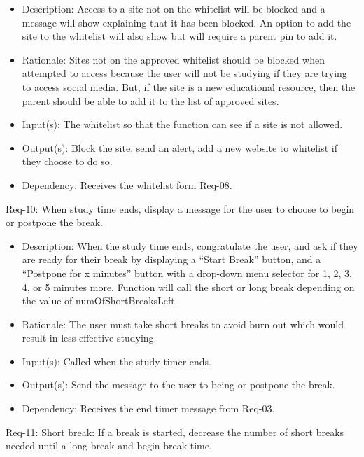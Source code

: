 \documentclass[12pt]{article}
\begin{document}
\begin{itemize}
    \item Description: Access to a site not on the whitelist will be blocked and a message will show explaining that it has been blocked. An option to add the site to the whitelist will also show but will require a parent pin to add it.
    \item Rationale: Sites not on the approved whitelist should be blocked when attempted to access because the user will not be studying if they are trying to access social media. But, if the site is a new educational resource, then the parent should be able to add it to the list of approved sites.
    \item Input(s): The whitelist so that the function can see if a site is not allowed.
    \item Output(s): Block the site, send an alert, add a new website to whitelist if they choose to do so.
    \item Dependency: Receives the whitelist form Req-08.
\end{itemize}
Req-10: When study time ends, display a message for the user to choose to begin or postpone the break.
\begin{itemize}
    \item Description: When the study time ends, congratulate the user, and ask if they are ready for their break by displaying a “Start Break” button, and a “Postpone for x minutes” button with a drop-down menu selector for 1, 2, 3, 4, or 5 minutes more. Function will call the short or long break depending on the value of numOfShortBreaksLeft.
    \item Rationale: The user must take short breaks to avoid burn out which would result in less effective studying.
    \item Input(s): Called when the study timer ends.
    \item Output(s): Send the message to the user to being or postpone the break.
    \item Dependency: Receives the end timer message from Req-03.
\end{itemize}
Req-11: Short break: If a break is started, decrease the number of short breaks needed until a long break and begin break time.
\end{document}
